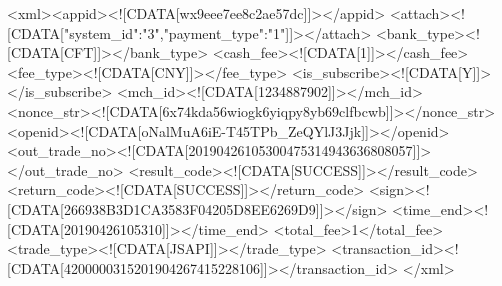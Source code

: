 <xml><appid><![CDATA[wx9eee7ee8c2ae57dc]]></appid>
<attach><![CDATA[{"system_id":"3","payment_type":"1"}]]></attach>
<bank_type><![CDATA[CFT]]></bank_type>
<cash_fee><![CDATA[1]]></cash_fee>
<fee_type><![CDATA[CNY]]></fee_type>
<is_subscribe><![CDATA[Y]]></is_subscribe>
<mch_id><![CDATA[1234887902]]></mch_id>
<nonce_str><![CDATA[6x74kda56wiogk6yiqpy8yb69clfbcwb]]></nonce_str>
<openid><![CDATA[oNalMuA6iE-T45TPb_ZeQYlJ3Jjk]]></openid>
<out_trade_no><![CDATA[20190426105300475314943636808057]]></out_trade_no>
<result_code><![CDATA[SUCCESS]]></result_code>
<return_code><![CDATA[SUCCESS]]></return_code>
<sign><![CDATA[266938B3D1CA3583F04205D8EE6269D9]]></sign>
<time_end><![CDATA[20190426105310]]></time_end>
<total_fee>1</total_fee>
<trade_type><![CDATA[JSAPI]]></trade_type>
<transaction_id><![CDATA[4200000315201904267415228106]]></transaction_id>
</xml>